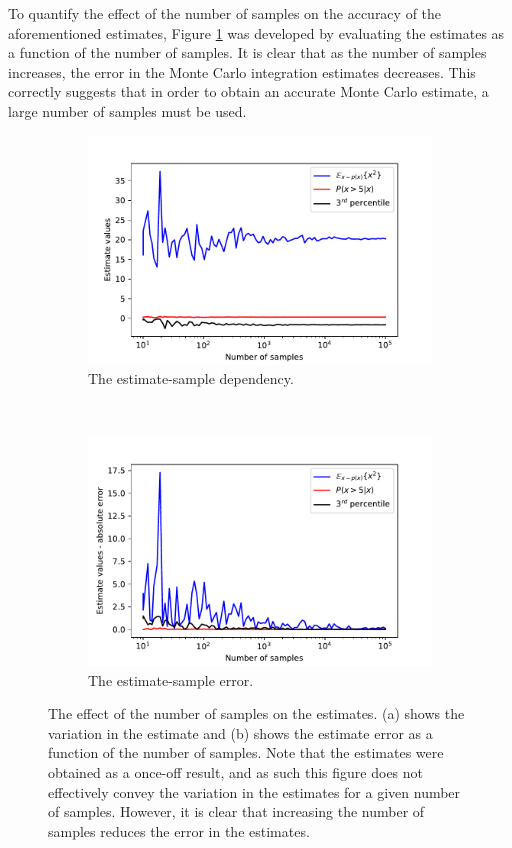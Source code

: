 \documentclass{article}
\begin{document}
	To quantify the effect of the number of samples on the accuracy of the aforementioned estimates, Figure \ref{fig:Q1_estimate_error} was developed by evaluating the estimates as a function of the number of samples. It is clear that as the number of samples increases, the error in the Monte Carlo integration estimates decreases. This correctly suggests that in order to obtain an accurate Monte Carlo estimate, a large number of samples must be used. 
	\begin{figure}[htb!]
		\centering
		\begin{subfigure}[b]{0.45\textwidth}
			\centering
			\includegraphics[width=\textwidth]{Q1g_1.pdf}
			\caption{The estimate-sample dependency.}
		\end{subfigure}
		~
		\begin{subfigure}[b]{0.45\textwidth}
			\centering
			\includegraphics[width=\textwidth]{Q1g_2.pdf}
			\caption{The estimate-sample error.}
		\end{subfigure}
		
		\caption{The effect of the number of samples on the estimates. (a) shows the variation in the estimate and (b) shows the estimate error as a function of the number of samples. Note that the estimates were obtained as a once-off result, and as such this figure does not effectively convey the variation in the estimates for a given number of samples. However, it is clear that increasing the number of samples reduces the error in the estimates.}
		\label{fig:Q1_estimate_error}
	\end{figure}
	
\end{document}
